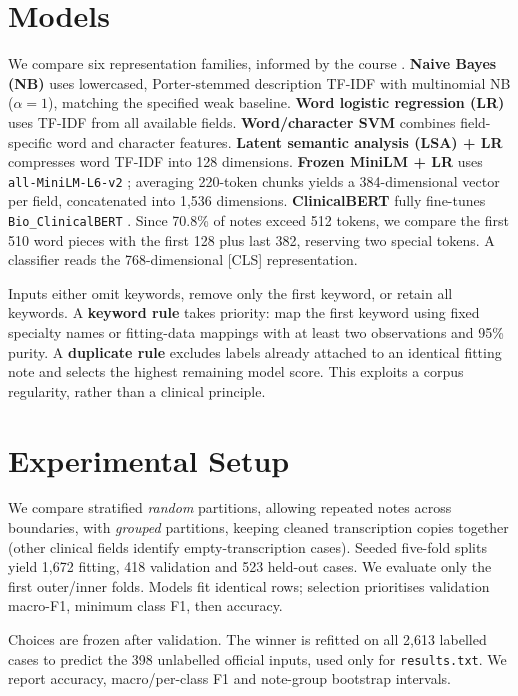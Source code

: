 \documentclass[twocolumn,10pt]{article}
\begin{document}
\section{Models}
We compare six representation families, informed by the course \cite{coheur2026}.
\textbf{Naive Bayes (NB)} uses lowercased, Porter-stemmed description TF-IDF with multinomial NB ($\alpha=1$), matching the specified weak baseline.
\textbf{Word logistic regression (LR)} uses TF-IDF from all available fields.
\textbf{Word/character SVM} combines field-specific word and character features.
\textbf{Latent semantic analysis (LSA) + LR} compresses word TF-IDF into 128 dimensions.
\textbf{Frozen MiniLM + LR} uses \texttt{all-MiniLM-L6-v2} \cite{reimers2019,wang2020,minilmcard}; averaging 220-token chunks yields a 384-dimensional vector per field, concatenated into 1,536 dimensions.
\textbf{ClinicalBERT} fully fine-tunes \texttt{Bio\_ClinicalBERT} \cite{alsentzer2019}. Since 70.8\% of notes exceed 512 tokens, we compare the first 510 word pieces with the first 128 plus last 382, reserving two special tokens. A classifier reads the 768-dimensional [CLS] representation.

Inputs either omit keywords, remove only the first keyword, or retain all keywords. A \textbf{keyword rule} takes priority: map the first keyword using fixed specialty names or fitting-data mappings with at least two observations and 95\% purity. A \textbf{duplicate rule} excludes labels already attached to an identical fitting note and selects the highest remaining model score. This exploits a corpus regularity, rather than a clinical principle.

\section{Experimental Setup}
We compare stratified \emph{random} partitions, allowing repeated notes across boundaries, with \emph{grouped} partitions, keeping cleaned transcription copies together (other clinical fields identify empty-transcription cases). Seeded five-fold splits yield 1,672 fitting, 418 validation and 523 held-out cases. We evaluate only the first outer/inner folds. Models fit identical rows; selection prioritises validation macro-F1, minimum class F1, then accuracy.

Choices are frozen after validation. The winner is refitted on all 2,613 labelled cases to predict the 398 unlabelled official inputs, used only for \texttt{results.txt}. We report accuracy, macro/per-class F1 and note-group bootstrap intervals.
\end{document}
